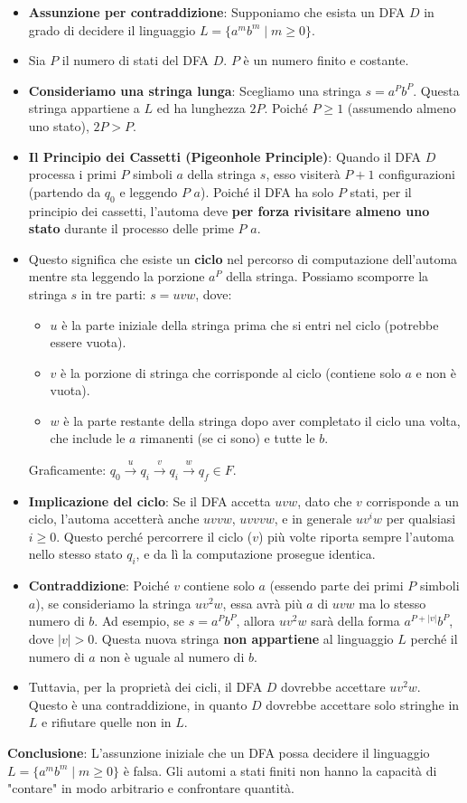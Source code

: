 \documentclass[a4paper]{article}
\theoremstyle{definition} %
\begin{document}
\begin{itemize}
    \item \textbf{Assunzione per contraddizione}: Supponiamo che esista un DFA $D$ in grado di decidere il linguaggio $L = \{a^m b^m \mid m \geq 0\}$.
    \item Sia $P$ il numero di stati del DFA $D$. $P$ è un numero finito e costante.
    \item \textbf{Consideriamo una stringa lunga}: Scegliamo una stringa $s = a^P b^P$. Questa stringa appartiene a $L$ ed ha lunghezza $2P$. Poiché $P \geq 1$ (assumendo almeno uno stato), $2P > P$.
    \item \textbf{Il Principio dei Cassetti (Pigeonhole Principle)}: Quando il DFA $D$ processa i primi $P$ simboli $a$ della stringa $s$, esso visiterà $P+1$ configurazioni (partendo da $q_0$ e leggendo $P$ $a$). Poiché il DFA ha solo $P$ stati, per il principio dei cassetti, l'automa deve \textbf{per forza rivisitare almeno uno stato} durante il processo delle prime $P$ $a$.
    \item Questo significa che esiste un \textbf{ciclo} nel percorso di computazione dell'automa mentre sta leggendo la porzione $a^P$ della stringa. Possiamo scomporre la stringa $s$ in tre parti: $s = uvw$, dove:
        \begin{itemize}
            \item $u$ è la parte iniziale della stringa prima che si entri nel ciclo (potrebbe essere vuota).
            \item $v$ è la porzione di stringa che corrisponde al ciclo (contiene solo $a$ e non è vuota).
            \item $w$ è la parte restante della stringa dopo aver completato il ciclo una volta, che include le $a$ rimanenti (se ci sono) e tutte le $b$.
        \end{itemize}
        Graficamente: $q_0 \xrightarrow{u} q_i \xrightarrow{v} q_i \xrightarrow{w} q_f \in F$.
    \item \textbf{Implicazione del ciclo}: Se il DFA accetta $uvw$, dato che $v$ corrisponde a un ciclo, l'automa accetterà anche $uvvw$, $uvvvw$, e in generale $uv^i w$ per qualsiasi $i \geq 0$. Questo perché percorrere il ciclo ($v$) più volte riporta sempre l'automa nello stesso stato $q_i$, e da lì la computazione prosegue identica.
    \item \textbf{Contraddizione}: Poiché $v$ contiene solo $a$ (essendo parte dei primi $P$ simboli $a$), se consideriamo la stringa $uv^2 w$, essa avrà più $a$ di $uvw$ ma lo stesso numero di $b$. Ad esempio, se $s = a^P b^P$, allora $uv^2 w$ sarà della forma $a^{P+|v|} b^P$, dove $|v| > 0$. Questa nuova stringa \textbf{non appartiene} al linguaggio $L$ perché il numero di $a$ non è uguale al numero di $b$.
    \item Tuttavia, per la proprietà dei cicli, il DFA $D$ dovrebbe accettare $uv^2 w$. Questo è una contraddizione, in quanto $D$ dovrebbe accettare solo stringhe in $L$ e rifiutare quelle non in $L$.
\end{itemize}
\textbf{Conclusione}: L'assunzione iniziale che un DFA possa decidere il linguaggio $L = \{a^m b^m \mid m \geq 0\}$ è falsa. Gli automi a stati finiti non hanno la capacità di "contare" in modo arbitrario e confrontare quantità.
\end{document}
